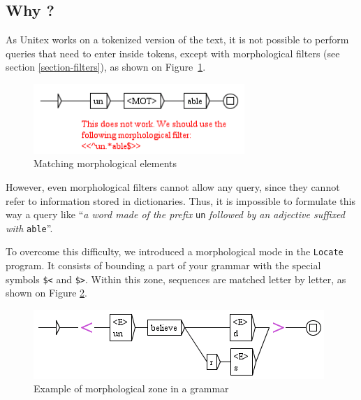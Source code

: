 \subsection{Why ?}
As Unitex works on a tokenized version of the text, it is not possible to
perform queries that need to enter inside tokens, except with morphological
filters (see section \ref{section-filters}), as shown on Figure~\ref{fig-morpho1}.

\begin{figure}[!ht]
\begin{center}
\includegraphics[width=8cm]{resources/img/fig6-17k.png}
\caption{Matching morphological elements\label{fig-morpho1}}
\end{center}
\end{figure}

\bigskip
\noindent However, even morphological filters cannot allow any query, since they
cannot refer to information stored in dictionaries. Thus, it is impossible to formulate this way a
query like ``\textit{a word made of the prefix} \verb$un$ \textit{followed by an
adjective suffixed with} \verb+able+''.

\bigskip
\noindent To overcome this difficulty, we introduced a morphological mode in
the \verb$Locate$ program. It consists of bounding a part of your grammar with
the special symbols \verb+$<+ and \verb+$>+.\index{\verb+$<+}\index{\verb+$>+}
Within this zone, sequences are matched letter by letter, as shown on Figure
\ref{fig-morpho2}.

\begin{figure}[!ht]
\begin{center}
\includegraphics[width=11cm]{resources/img/fig6-17l.png}
\caption{Example of morphological zone in a grammar\label{fig-morpho2}}
\end{center}
\end{figure}


